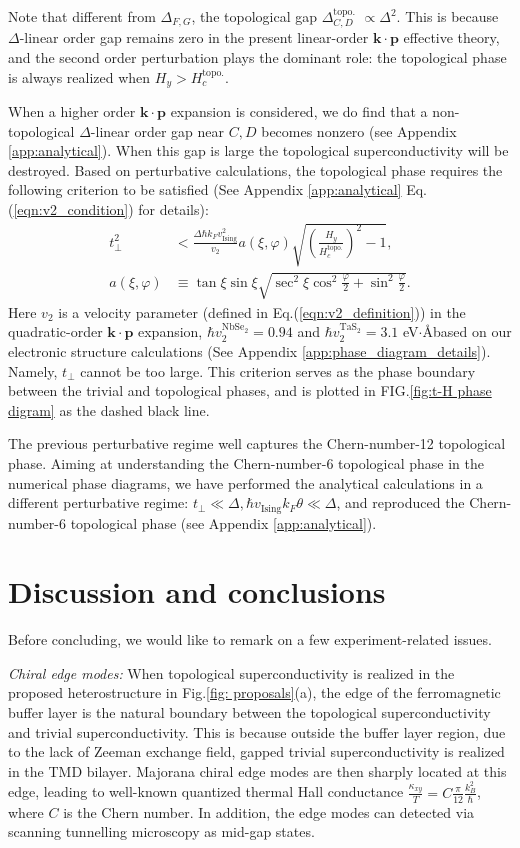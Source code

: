 Note that different from $\Delta_{F,G}$, the topological gap $\Delta^{\text{topo.}}_{C,D}$ $\propto\Delta^2$. This is because $\Delta$-linear order gap remains zero in the present linear-order $\bm{k\cdot p}$ effective theory, and the second order perturbation plays the dominant role: the topological phase is always realized when $H_y>H^{\text{topo.}}_{c}$. 

When a higher order $\bm{k\cdot p}$ expansion is considered, we do find that a non-topological $\Delta$-linear order gap near $C,D$ becomes nonzero (see Appendix \ref{app:analytical}). When this gap is large the topological superconductivity will be destroyed. Based on perturbative calculations, the topological phase requires the following criterion to be satisfied (See Appendix \ref{app:analytical} Eq.(\ref{eqn:v2_condition}) for details):
\begin{align}
    t_\perp^2 &< \frac{\Delta \hbar k_F v^2_{\text{Ising}}}{v_2}a(\xi,\varphi)\sqrt{\left(\frac{H_y}{H_c^{\text{topo.}}}\right)^2-1},\label{Phase boundary}\\
    a(\xi,\varphi)&\equiv \tan\xi\sin\xi\sqrt{\sec^2\xi\cos^2\frac{\varphi}{2}+\sin^2\frac{\varphi}{2}}.\nonumber
\end{align}
Here $v_2$ is a velocity parameter (defined in Eq.(\ref{eqn:v2_definition})) in the quadratic-order $\bm{k\cdot p}$ expansion, $\hbar v^{\text{NbSe}_2}_2=0.94$ and $\hbar v^{\text{TaS}_2}_2=3.1$ eV$\cdot$\AA based on our electronic structure calculations (See Appendix \ref{app:phase_diagram_details}). Namely, $t_\perp$ cannot be too large. This criterion serves as the phase boundary between the trivial and topological phases, and is plotted in FIG.\ref{fig:t-H phase digram} as the dashed black line.

The previous perturbative regime well captures the Chern-number-12 topological phase. Aiming at understanding the Chern-number-6 topological phase in the numerical phase diagrams, we have performed the analytical calculations in a different perturbative regime: $t_\perp\ll\Delta,\hbar v_{\text{Ising}}k_F\theta\ll\Delta$, and reproduced the Chern-number-6 topological phase (see Appendix \ref{app:analytical}).


\section{Discussion and conclusions}
Before concluding, we would like to remark on a few experiment-related issues. 

\emph{Chiral edge modes:} When topological superconductivity is realized in the proposed heterostructure in Fig.\ref{fig: proposals}(a), the edge of the ferromagnetic buffer layer is the natural boundary between the topological superconductivity and trivial superconductivity. This is because outside the buffer layer region, due to the lack of Zeeman exchange field, gapped trivial superconductivity is realized in the TMD bilayer. Majorana chiral edge modes are then sharply located at this edge, leading to well-known quantized thermal Hall conductance $\frac{\kappa_{xy}}{T}=C\frac{\pi}{12}\frac{k_B^2}{\hbar}$, where $C$ is the Chern number. In addition, the edge modes can detected via scanning tunnelling microscopy as mid-gap states.

